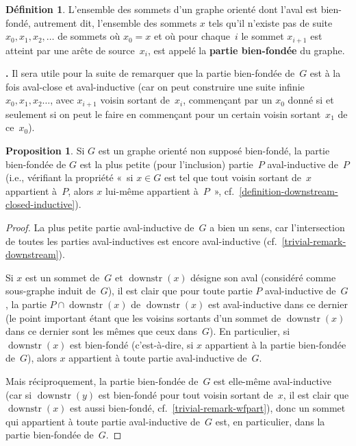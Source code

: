 \documentclass[12pt,a4paper]{article}
\theoremstyle{definition}
\newcommand\thingy{%
\refstepcounter{comcnt}\smallskip\noindent\textbf{\thecomcnt.} }
\newtheorem{defn}[comcnt]{Définition}
\newtheorem{prop}[comcnt]{Proposition}
\newcommand{\downstr}{\operatorname{downstr}}
\newcommand{\defin}[2][]{\def\latexsucks{#1}\ifx\latexsucks\empty\index{#2}\else\index{\latexsucks}\fi\textbf{#2}}
\begin{document}
\begin{defn}\label{definition-wfpart}
L'ensemble des sommets d'un graphe orienté dont l'aval est bien-fondé,
autrement dit, l'ensemble des sommets $x$ tels qu'il n'existe pas de
suite $x_0,x_1,x_2,\ldots$ de sommets où $x_0 = x$ et où pour
chaque $i$ le sommet $x_{i+1}$ est atteint par une arête de
source $x_i$, est appelé la \defin{partie bien-fondée} du graphe.
\end{defn}

\thingy\label{trivial-remark-wfpart} Il sera utile pour la suite de
remarquer que la partie bien-fondée de $G$ est à la fois aval-close et
aval-inductive (car on peut construire une suite infinie $x_0, x_1,
x_2\ldots$, avec $x_{i+1}$ voisin sortant de $x_i$, commençant par un
$x_0$ donné si et seulement si on peut le faire en commençant pour un
certain voisin sortant $x_1$ de ce $x_0$).

\begin{prop}\label{wfpart-is-smallest-inductive}
Si $G$ est un graphe orienté non supposé bien-fondé, la partie
bien-fondée de $G$ est la plus petite (pour l'inclusion) partie $P$
aval-inductive de $P$ (i.e., vérifiant la propriété « si $x \in
  G$ est tel que tout voisin sortant de $x$ appartient à $P$, alors
  $x$ lui-même appartient à $P$ »,
cf. \ref{definition-downstream-closed-inductive}).
\end{prop}
\begin{proof}
La plus petite partie aval-inductive de $G$ a bien un sens, car
l'intersection de toutes les parties aval-inductives est encore
aval-inductive (cf. \ref{trivial-remark-downstream}).

Si $x$ est un sommet de $G$ et $\downstr(x)$ désigne son aval
(considéré comme sous-graphe induit de $G$), il est clair que pour
toute partie $P$ aval-inductive de $G$, la partie $P \cap \downstr(x)$
de $\downstr(x)$ est aval-inductive dans ce dernier (le point
important étant que les voisins sortants d'un sommet de $\downstr(x)$
dans ce dernier sont les mêmes que ceux dans $G$).  En particulier, si
$\downstr(x)$ est bien-fondé (c'est-à-dire, si $x$ appartient à la
partie bien-fondée de $G$), alors $x$ appartient à toute partie
aval-inductive de $G$.

Mais réciproquement, la partie bien-fondée de $G$ est elle-même
aval-inductive (car si $\downstr(y)$ est bien-fondé pour tout voisin
sortant de $x$, il est clair que $\downstr(x)$ est aussi bien-fondé,
cf. \ref{trivial-remark-wfpart}), donc un sommet qui appartient à
toute partie aval-inductive de $G$ est, en particulier, dans la partie
bien-fondée de $G$.
\end{proof}
\end{document}
